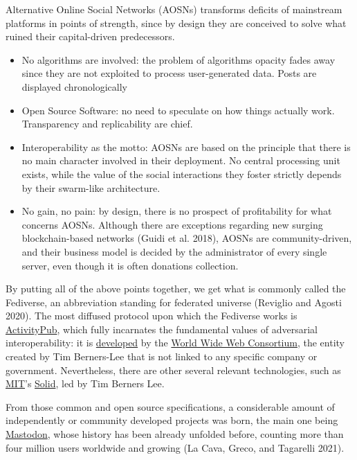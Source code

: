 \documentclass[
  a4paper,
]{book}
\providecommand{\tightlist}{%
  \setlength{\itemsep}{0pt}\setlength{\parskip}{0pt}}
\begin{document}
Alternative Online Social Networks (AOSNs) transforms deficits of mainstream platforms in points of strength, since by design they are conceived to solve what ruined their capital-driven predecessors.

\begin{itemize}
\tightlist
\item
  No algorithms are involved: the problem of algorithms opacity fades away since they are not exploited to process user-generated data. Posts are displayed chronologically
\item
  Open Source Software: no need to speculate on how things actually work. Transparency and replicability are chief.
\item
  Interoperability as the motto: AOSNs are based on the principle that there is no main character involved in their deployment. No central processing unit exists, while the value of the social interactions they foster strictly depends by their swarm-like architecture.
\item
  No gain, no pain: by design, there is no prospect of profitability for what concerns AOSNs. Although there are exceptions regarding new surging blockchain-based networks {(Guidi et al. 2018)}, AOSNs are community-driven, and their business model is decided by the administrator of every single server, even though it is often donations collection.
\end{itemize}

By putting all of the above points together, we get what is commonly called the Fediverse, an abbreviation standing for federated universe {(Reviglio and Agosti 2020)}. The most diffused protocol upon which the Fediverse works is \href{https://activitypub.rocks}{ActivityPub}, which fully incarnates the fundamental values of adversarial interoperability: it is \href{https://www.w3.org/TR/activitypub/}{developed} by the \href{https://www.w3.org}{World Wide Web Consortium}, the entity created by Tim Berners-Lee that is not linked to any specific company or government. Nevertheless, there are other several relevant technologies, such as \href{https://mit.edu}{MIT}'s \href{https://solidproject.org}{Solid}, led by Tim Berners Lee.

From those common and open source specifications, a considerable amount of independently or community developed projects was born, the main one being \href{https://joinmastodon.org}{Mastodon}, whose history has been already unfolded before, counting more than four million users worldwide and growing {(La Cava, Greco, and Tagarelli 2021)}.
\end{document}

